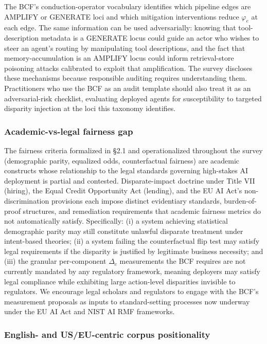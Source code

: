\documentclass[acmsmall,nonacm]{acmart}
\begin{document}
The BCF's conduction-operator vocabulary identifies which pipeline edges are AMPLIFY or GENERATE loci and which mitigation interventions reduce $\varphi_e$ at each edge. The same information can be used adversarially: knowing that tool-description metadata is a GENERATE locus \cite{sneh2025tooltweak} could guide an actor who wishes to steer an agent's routing by manipulating tool descriptions, and the fact that memory-accumulation is an AMPLIFY locus could inform retrieval-store poisoning attacks \cite{wang2025bias} calibrated to exploit that amplification. The survey discloses these mechanisms because responsible auditing requires understanding them. Practitioners who use the BCF as an audit template should also treat it as an adversarial-risk checklist, evaluating deployed agents for susceptibility to targeted disparity injection at the loci this taxonomy identifies.

\subsubsection{Academic-vs-legal fairness gap}

The fairness criteria formalized in \S{}2.1 and operationalized throughout the survey (demographic parity, equalized odds, counterfactual fairness) are academic constructs whose relationship to the legal standards governing high-stakes AI deployment is partial and contested. Disparate-impact doctrine under Title VII (hiring), the Equal Credit Opportunity Act (lending), and the EU AI Act's non-discrimination provisions each impose distinct evidentiary standards, burden-of-proof structures, and remediation requirements that academic fairness metrics do not automatically satisfy. Specifically: (i) a system achieving statistical demographic parity may still constitute unlawful disparate treatment under intent-based theories; (ii) a system failing the counterfactual flip test may satisfy legal requirements if the disparity is justified by legitimate business necessity; and (iii) the granular per-component $\Delta_c$ measurements the BCF requires are not currently mandated by any regulatory framework, meaning deployers may satisfy legal compliance while exhibiting large action-level disparities invisible to regulators. We encourage legal scholars and regulators to engage with the BCF's measurement proposals as inputs to standard-setting processes now underway under the EU AI Act and NIST AI RMF frameworks.

\subsubsection{English- and US/EU-centric corpus positionality}
\end{document}

